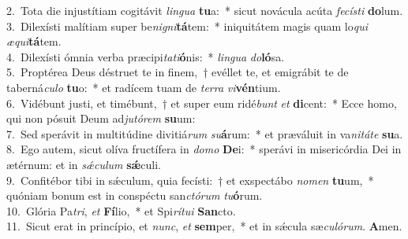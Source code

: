 {2.~}Tota die injustítiam cogitávit \textit{lin}\textit{gua} \textbf{tu}a:~* sicut novácula acúta \textit{fe}\textit{cí}\textit{sti} \textbf{do}lum.\\
{3.~}Dilexísti malítiam super be\textit{ni}\textit{gni}\textbf{tá}tem:~* iniquitátem magis quam lo\textit{qui} \textit{æ}\textit{qui}\textbf{tá}tem.\\
{4.~}Dilexísti ómnia verba præcipi\textit{ta}\textit{ti}\textbf{ó}nis:~* \textit{lin}\textit{gua} \textit{do}\textbf{ló}sa.\\
{5.~}Proptérea Deus déstruet te in finem,~† evéllet te, et emigrábit te de taberná\textit{cu}\textit{lo} \textbf{tu}o:~* et radícem tuam de \textit{ter}\textit{ra} \textit{vi}\textbf{vén}tium.\\
{6.~}Vidébunt justi, et timébunt,~† et super eum ridé\textit{bunt} \textit{et} \textbf{di}cent:~* Ecce homo, qui non pósuit Deum ad\textit{ju}\textit{tó}\textit{rem} \textbf{su}um:\\
{7.~}Sed sperávit in multitúdine divitiá\textit{rum} \textit{su}\textbf{á}rum:~* et præváluit in va\textit{ni}\textit{tá}\textit{te} \textbf{su}a.\\
{8.~}Ego autem, sicut olíva fructífera in \textit{do}\textit{mo} \textbf{De}i:~* sperávi in misericórdia Dei in ætérnum: et in \textit{sǽ}\textit{cu}\textit{lum} \textbf{sǽ}culi.\\
{9.~}Confitébor tibi in sǽculum, quia fecísti:~† et exspectábo \textit{no}\textit{men} \textbf{tu}um,~* quóniam bonum est in conspéctu san\textit{ctó}\textit{rum} \textit{tu}\textbf{ó}rum.\\
{10.~}Glória Pa\textit{tri}, \textit{et} \textbf{Fí}lio,~* et Spi\textit{rí}\textit{tu}\textit{i} \textbf{San}cto.\\
{11.~}Sicut erat in princípio, et \textit{nunc}, \textit{et} \textbf{sem}per,~* et in sǽcula sæ\textit{cu}\textit{ló}\textit{rum}. \textbf{A}men.\\
